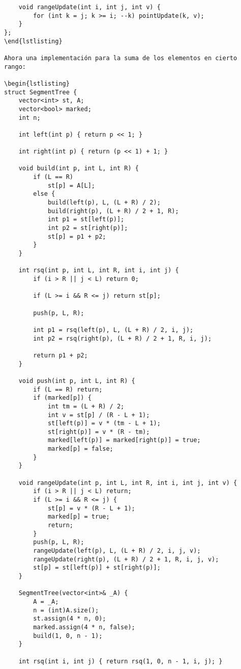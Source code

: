 \documentclass[11pt]{article}
\begin{document}
\begin{verbatim}
    void rangeUpdate(int i, int j, int v) {
        for (int k = j; k >= i; --k) pointUpdate(k, v);
    }
};
\end{lstlisting}

Ahora una implementación para la suma de los elementos en cierto rango:

\begin{lstlisting}
struct SegmentTree {
    vector<int> st, A;
    vector<bool> marked;
    int n;

    int left(int p) { return p << 1; }

    int right(int p) { return (p << 1) + 1; }

    void build(int p, int L, int R) {
        if (L == R)
            st[p] = A[L];
        else {
            build(left(p), L, (L + R) / 2);
            build(right(p), (L + R) / 2 + 1, R);
            int p1 = st[left(p)];
            int p2 = st[right(p)];
            st[p] = p1 + p2;
        }
    }

    int rsq(int p, int L, int R, int i, int j) {
        if (i > R || j < L) return 0;

        if (L >= i && R <= j) return st[p];

        push(p, L, R);

        int p1 = rsq(left(p), L, (L + R) / 2, i, j);
        int p2 = rsq(right(p), (L + R) / 2 + 1, R, i, j);

        return p1 + p2;
    }

    void push(int p, int L, int R) {
        if (L == R) return;
        if (marked[p]) {
            int tm = (L + R) / 2;
            int v = st[p] / (R - L + 1);
            st[left(p)] = v * (tm - L + 1);
            st[right(p)] = v * (R - tm);
            marked[left(p)] = marked[right(p)] = true;
            marked[p] = false;
        }
    }

    void rangeUpdate(int p, int L, int R, int i, int j, int v) {
        if (i > R || j < L) return;
        if (L >= i && R <= j) {
            st[p] = v * (R - L + 1);
            marked[p] = true;
            return;
        }
        push(p, L, R);
        rangeUpdate(left(p), L, (L + R) / 2, i, j, v);
        rangeUpdate(right(p), (L + R) / 2 + 1, R, i, j, v);
        st[p] = st[left(p)] + st[right(p)];
    }

    SegmentTree(vector<int>& _A) {
        A = _A;
        n = (int)A.size();
        st.assign(4 * n, 0);
        marked.assign(4 * n, false);
        build(1, 0, n - 1);
    }

    int rsq(int i, int j) { return rsq(1, 0, n - 1, i, j); }


\end{verbatim}
\end{document}
